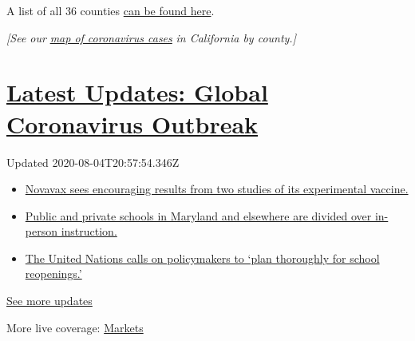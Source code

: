A list of all 36 counties
\href{https://covid19.ca.gov/roadmap-counties/}{can be found here}.

\emph{{[}See our}
\href{https://www.nytimes.com/interactive/2020/us/california-coronavirus-cases.html}{\emph{map
of coronavirus cases}} \emph{in California by county.{]}}

\hypertarget{latest-updates-global-coronavirus-outbreak}{%
\section{\texorpdfstring{\href{https://www.nytimes.com/2020/08/04/world/coronavirus-cases.html?action=click\&pgtype=Article\&state=default\&region=MAIN_CONTENT_1\&context=storylines_live_updates}{Latest
Updates: Global Coronavirus
Outbreak}}{Latest Updates: Global Coronavirus Outbreak}}\label{latest-updates-global-coronavirus-outbreak}}

Updated 2020-08-04T20:57:54.346Z

\begin{itemize}
\tightlist
\item
  \href{https://www.nytimes.com/2020/08/04/world/coronavirus-cases.html?action=click\&pgtype=Article\&state=default\&region=MAIN_CONTENT_1\&context=storylines_live_updates\#link-1228a480}{Novavax
  sees encouraging results from two studies of its experimental
  vaccine.}
\item
  \href{https://www.nytimes.com/2020/08/04/world/coronavirus-cases.html?action=click\&pgtype=Article\&state=default\&region=MAIN_CONTENT_1\&context=storylines_live_updates\#link-4825b93}{Public
  and private schools in Maryland and elsewhere are divided over
  in-person instruction.}
\item
  \href{https://www.nytimes.com/2020/08/04/world/coronavirus-cases.html?action=click\&pgtype=Article\&state=default\&region=MAIN_CONTENT_1\&context=storylines_live_updates\#link-50f7386d}{The
  United Nations calls on policymakers to `plan thoroughly for school
  reopenings.'}
\end{itemize}

\href{https://www.nytimes.com/2020/08/04/world/coronavirus-cases.html?action=click\&pgtype=Article\&state=default\&region=MAIN_CONTENT_1\&context=storylines_live_updates}{See
more updates}

More live coverage:
\href{https://www.nytimes.com/live/2020/08/04/business/stock-market-today-coronavirus?action=click\&pgtype=Article\&state=default\&region=MAIN_CONTENT_1\&context=storylines_live_updates}{Markets}

